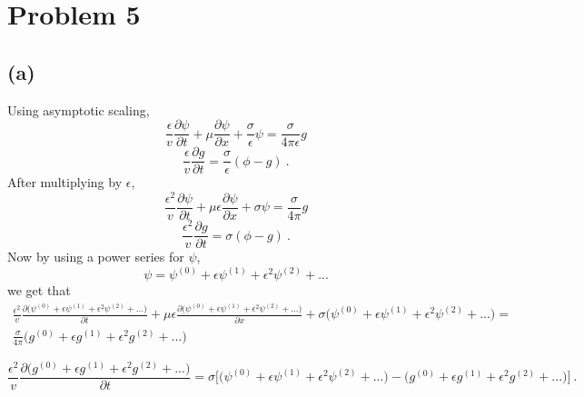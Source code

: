 \documentclass{article}
\begin{document}
\pagebreak

\section*{Problem 5}

\subsection*{(a)} 
Using asymptotic scaling,
\begin{equation*}
\frac{\epsilon}{v} \frac{\partial \psi}{\partial t} + \mu \frac{\partial \psi}{\partial x} + \frac{\sigma}{\epsilon} \psi = \frac{\sigma}{4\pi \epsilon} g 
\end{equation*}
\begin{equation*}
\frac{\epsilon}{v} \frac{\partial g}{\partial t}  = \frac{\sigma}{\epsilon} (\phi - g) \: .
\end{equation*}
After multiplying by $\epsilon$,
\begin{equation*}
\frac{\epsilon^2}{v} \frac{\partial \psi}{\partial t} + \mu \epsilon \frac{\partial \psi}{\partial x} + \sigma \psi = \frac{\sigma}{4\pi} g 
\end{equation*}
\begin{equation*}
\frac{\epsilon^2}{v} \frac{\partial g}{\partial t}  = \sigma (\phi - g) \: .
\end{equation*}
Now by using a power series for $\psi$, 
\begin{equation*}
\psi = \psi^{(0)} + \epsilon \psi^{(1)} + \epsilon^2 \psi^{(2)} + ... 
\end{equation*}
we get that
\begin{multline*}
\frac{\epsilon^2}{v} \frac{\partial \big(\psi^{(0)} + \epsilon \psi^{(1)} + \epsilon^2 \psi^{(2)} + ... \big)}{\partial t} + \mu \epsilon \frac{\partial \big(\psi^{(0)} + \epsilon \psi^{(1)} + \epsilon^2 \psi^{(2)} + ... \big)}{\partial x} + \sigma \big( \psi^{(0)} + \epsilon \psi^{(1)} + \epsilon^2 \psi^{(2)} + ... \big) = \\ \frac{\sigma}{4\pi} \big( g^{(0)} + \epsilon g^{(1)} + \epsilon^2 g^{(2)} + ... \big) \: 
\end{multline*}

\begin{equation*}
\frac{\epsilon^2}{v} \frac{\partial \big( g^{(0)} + \epsilon g^{(1)} + \epsilon^2 g^{(2)} + ... \big)}{\partial t} = \sigma \Big[ \big( \psi^{(0)} + \epsilon \psi^{(1)} + \epsilon^2 \psi^{(2)} + ... \big) - \big( g^{(0)} + \epsilon g^{(1)} + \epsilon^2 g^{(2)} + ... \big)  \Big] \: .
\end{equation*}
\end{document}
